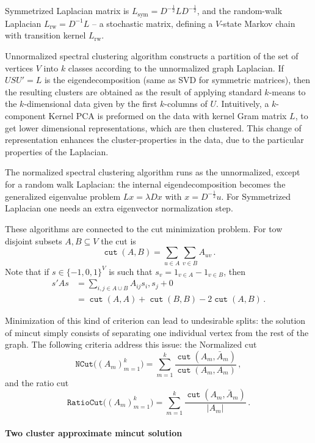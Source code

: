 \documentclass[a4paper]{article}
\newcommand{\cut}{\mathop{\mathtt{cut}}\nolimits}
\begin{document}
Symmetrized Laplacian matrix is $L_\text{sym} = D^{-\frac{1}{2}} L D^{-\frac{1}{2}}$,
and the random-walk Laplacian $L_\text{rw} = D^{-1} L$ -- a stochastic matrix, defining
a $V$-state Markov chain with transition kernel $L_\text{rw}$.

Unnormalized spectral clustering algorithm constructs a partition of the set of
vertices $V$ into $k$ classes according to the unnormalized graph Laplacian. If
$USU' = L$ is the eigendecomposition (same as SVD for symmetric matrices), then
the resulting clusters are obtained as the result of applying standard $k$-means
to the $k$-dimensional data given by the first $k$-columns of $U$. Intuitively,
a $k$-component Kernel PCA is preformed on the data with kernel Gram matrix $L$,
to get lower dimensional representations, which are then clustered. This change
of representation enhances the cluster-properties in the data, due to the particular
properties of the Laplacian. 

The normalized spectral clustering algorithm runs as the unnormalized, except for
a random walk Laplacian: the internal eigendecomposition becomes the generalized
eigenvalue problem $L x = \lambda D x$ with $x = D^{-\frac{1}{2}} u$. For Symmetrized
Laplacian one needs an extra eigenvector normalization step.

These algorithms are connected to the cut minimization problem. For tow disjoint
subsets $A,B\subseteq V$ the cut is 
$$ \cut(A,B) = \sum_{u\in A} \sum_{v\in B} A_{uv} \,. $$
Note that if $s\in \{-1, 0,1\}^V$ is such that $s_v = 1_{v\in A} - 1_{v\in B}$, then
\begin{align*}
s' A s
    &= \sum_{i,j\in A\cup B} A_{ij} s_i, s_j + 0\\
    &= \cut(A, A) + \cut(B, B) - 2\cut(A,B) \,.
\end{align*}

Minimization of this kind of criterion can lead to undesirable splits: the solution
of mincut simply consists of separating one individual vertex from the rest of the
graph. The following criteria address this issue: the Normalized cut
$$ \mathtt{NCut}\bigl((A_m)_{m=1}^k\bigr)
    = \sum_{m=1}^k \frac{\cut(A_m,\bar{A}_m)}{\cut(A_m,A_m)}
    \,, $$
and the ratio cut
$$ \mathtt{RatioCut}\bigl((A_m)_{m=1}^k\bigr)
    = \sum_{m=1}^k \frac{\cut(A_m,\bar{A}_m)}{|A_m|}
    \,. $$

\paragraph{Two cluster approximate mincut solution} %
\label{par:two_cluster_approximate_mincut_solution}
\end{document}
